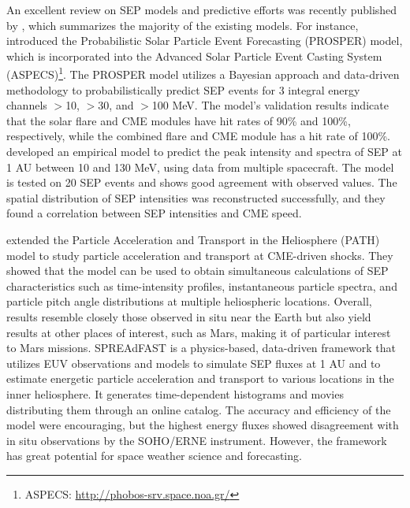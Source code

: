 An excellent review on SEP models and predictive efforts was recently published by \citet{whitman_2022}, which summarizes the majority of the existing models.
For instance, \citet{papaioannou_2022} introduced the Probabilistic Solar Particle Event Forecasting (PROSPER) model, which is incorporated into the Advanced Solar Particle Event Casting System (ASPECS)\footnote{ASPECS: \url{http://phobos-srv.space.noa.gr/}}. The PROSPER model utilizes a Bayesian approach and data-driven methodology to probabilistically predict SEP events for 3 integral energy channels $>$10, $>$30, and $>$100 MeV. The model's validation results indicate that the solar flare and CME modules have hit rates of 90\% and 100\%, respectively, while the combined flare and CME module has a hit rate of 100\%.
\citet{bruno_2021} developed an empirical model to predict the peak intensity and spectra of SEP at 1 AU between 10 and 130 MeV, using data from multiple spacecraft. The model is tested on 20 SEP events and shows good agreement with observed values. The spatial distribution of SEP intensities was reconstructed successfully, and they found a correlation between SEP intensities and CME speed.

\citet{hu_2017} extended the Particle Acceleration and Transport in the Heliosphere (PATH) model to study particle acceleration and transport at CME-driven shocks. They showed that the model can be used to obtain simultaneous calculations of SEP characteristics such as time-intensity profiles, instantaneous particle spectra, and particle pitch angle distributions at multiple heliospheric locations. Overall, results resemble closely those observed in situ near the Earth but also yield results at other places of interest, such as Mars, making it of particular interest to Mars missions.
SPREAdFAST \citep{kozarev_2017, kozarev_2022} is a physics-based, data-driven framework that utilizes EUV observations and models to simulate SEP fluxes at 1 AU and to estimate energetic particle acceleration and transport to various locations in the inner heliosphere. It generates time-dependent histograms and movies distributing them through an online catalog. The accuracy and efficiency of the model were encouraging, but the highest energy fluxes showed disagreement with in situ observations by the SOHO/ERNE instrument. However, the framework has great potential for space weather science and forecasting.

